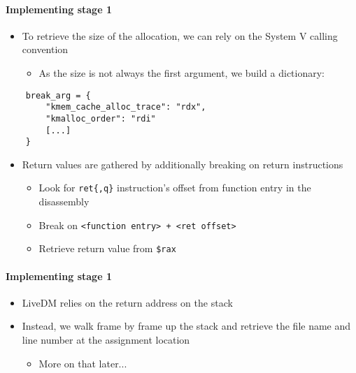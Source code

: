 \documentclass{i20lecture}
\begin{document}
\begin{frame}[fragile]{\insertsection}
  \framesubtitle{Implementing stage 1}

    \begin{itemize}
     \item To retrieve the size of the allocation, we can rely on the System V calling convention
\pause
     \begin{itemize}
      \item As the size is not always the first argument, we build a dictionary:
     \end{itemize}
    \end{itemize}
    \begin{lstlisting}
    break_arg = {
        "kmem_cache_alloc_trace": "rdx",
        "kmalloc_order": "rdi"
        [...]
    }
    \end{lstlisting}
\pause
	\begin{itemize}
		\item Return values are gathered by additionally breaking on return instructions
		\pause
		\begin{itemize}
			\item Look for \lstinline|ret{,q}| instruction's offset from function entry in the disassembly
			\pause
			\item Break on \lstinline|<function entry> + <ret offset>|
			\pause
			\item Retrieve return value from \lstinline|$rax|
		\end{itemize}
	\end{itemize}
\end{frame}

\begin{frame}{\insertsection}
  \framesubtitle{Implementing stage 1}

    \begin{itemize}
     \item LiveDM relies on the return address on the stack
\pause
     \item Instead, we walk frame by frame up the stack and retrieve the file name and line number at the assignment location
\pause
     \begin{itemize}
      \item More on that later...
     \end{itemize}
    \end{itemize}
\end{frame}
\end{document}
